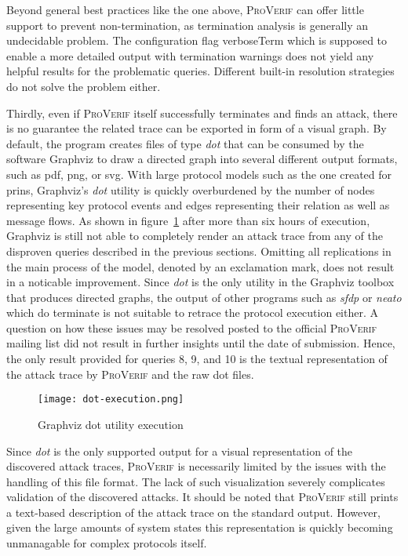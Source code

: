 Beyond general best practices like the one above, \textsc{ProVerif} can offer little support to prevent non-termination, as termination analysis is generally an undecidable problem.
The configuration flag {\sffamily verboseTerm} which is supposed to enable a more detailed output with termination warnings does not yield any helpful results for the problematic queries.
Different built-in resolution strategies do not solve the problem either.\medskip

Thirdly, even if \textsc{ProVerif} itself successfully terminates and finds an attack, there is no guarantee the related trace can be exported in form of a visual graph.
By default, the program creates files of type \textit{dot} that can be consumed by the software Graphviz to draw a directed graph into several different output formats, such as pdf, png, or svg.
With large protocol models such as the one created for \gls{prins}, Graphviz's \textit{dot} utility is quickly overburdened by the number of nodes representing key protocol events and edges representing their relation as well as message flows.
As shown in figure~\ref{fig:dot-execution} after more than six hours of execution, Graphviz is still not able to completely render an attack trace from any of the disproven queries described in the previous sections.
Omitting all replications in the main process of the model, denoted by an exclamation mark, does not result in a noticable improvement.
Since \textit{dot} is the only utility in the Graphviz toolbox that produces directed graphs, the output of other programs such as \textit{sfdp} or \textit{neato} which do terminate is not suitable to retrace the protocol execution either.
A question on how these issues may be resolved posted to the official \textsc{ProVerif} mailing list did not result in further insights until the date of submission.
Hence, the only result provided for queries 8, 9, and 10 is the textual representation of the attack trace by \textsc{ProVerif} and the raw dot files.

\begin{figure}[h!]
    \texttt{[image: dot-execution.png]}
    \centering
    \caption{Graphviz dot utility execution}
    \label{fig:dot-execution}
\end{figure}

Since \textit{dot} is the only supported output for a visual representation of the discovered attack traces, \textsc{ProVerif} is necessarily limited by the issues with the handling of this file format.
The lack of such visualization severely complicates validation of the discovered attacks.
It should be noted that \textsc{ProVerif} still prints a text-based description of the attack trace on the standard output.
However, given the large amounts of system states this representation is quickly becoming unmanagable for complex protocols itself.\medskip

